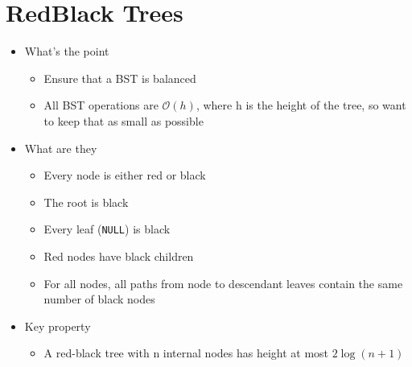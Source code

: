 \documentclass{article}[18pt]
\begin{document}
\section{RedBlack Trees}
\begin{itemize}
	\item What's the point
	\begin{itemize}
		\item Ensure that a BST is balanced
		\item All BST operations are $\mathcal{O}(h)$, where h is the height of the tree, so want to keep that as small as possible
	\end{itemize}
	\item What are they
	\begin{itemize}
		\item Every node is either red or black
		\item The root is black
		\item Every leaf (\texttt{NULL}) is black
		\item Red nodes have black children
		\item For all nodes, all paths from node to descendant leaves contain the same number of black nodes
	\end{itemize}
	\item Key property
	\begin{itemize}
		\item A red-black tree with n internal nodes has height at most $2\log(n+1)$
	\end{itemize}
\end{itemize}
\end{document}

